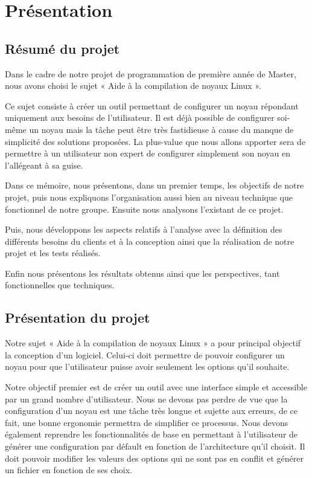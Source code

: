 \documentclass[16pts]{report}
\begin{document}

\nocite{*}

\chapter{Présentation}
\label{cha:Présentation}

\section{Résumé du projet}
\label{sec:Résumé du projet}

Dans le cadre de notre projet de programmation de première année de Master, 
nous avons choisi le sujet « Aide à la compilation de noyaux Linux ».

Ce sujet consiste à créer un outil permettant de configurer un noyau répondant 
uniquement aux besoins de l'utilisateur. Il est déjà possible de 
configurer soi-même un noyau mais la tâche peut être très fastidieuse 
à cause du manque de simplicité des solutions proposées. La plus-value 
que nous allons apporter sera de permettre à un utilisateur non expert 
de configurer simplement son noyau en l'allégeant à sa guise.

Dans ce mémoire, nous présentons, dans un premier temps, les objectifs de 
notre projet, puis nous expliquons l’organisation aussi bien au niveau 
technique que fonctionnel de notre groupe. Ensuite nous analysons l'existant 
de ce projet.

Puis, nous développons les aspects relatifs à l’analyse avec la définition 
des différents besoins du clients et à la conception ainsi que la réalisation 
de notre projet et les tests réalisés.

Enfin nous présentons les résultats obtenus ainsi que les perspectives, 
tant fonctionnelles que techniques.


\section{Présentation du projet}
\label{sec:Présentation du projet}

Notre sujet « Aide à la compilation de noyaux Linux » a pour principal 
objectif la conception d'un logiciel. Celui-ci doit permettre de pouvoir 
configurer un noyau pour que l'utilisateur puisse avoir seulement les 
options qu'il souhaite. 

Notre objectif premier est de créer un outil avec une interface simple et 
accessible par un grand nombre d'utilisateur. Nous ne devons pas perdre 
de vue que la configuration d'un noyau est une tâche très longue et 
sujette aux erreurs, de ce fait, une bonne ergonomie permettra de 
simplifier ce processus. Nous devons également reprendre les fonctionnalités 
de base en permettant à l'utilisateur de générer une configuration par 
défault en fonction de l'architecture qu'il choisit. Il doit pouvoir 
modifier les valeurs des options qui ne sont pas en conflit et générer 
un fichier en fonction de ses choix.
\end{document}

